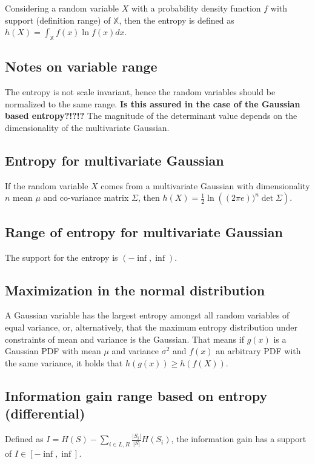 \documentclass[10pt,a4paper]{article}
\begin{document}
Considering a random variable $X$ with a probability density function $f$ with support (definition range) of $\mathbb{X}$, then the entropy is defined as $h(X) = \int_{\mathbb{X}}f(x)\ln f(x) dx$.

\subsection{Notes on variable range}
The entropy is not scale invariant, hence the random variables should be normalized to the same range.
\textbf{Is this assured in the case of the Gaussian based entropy?!?!?}
The magnitude of the determinant value depends on the dimensionality of the multivariate Gaussian.

\subsection{Entropy for multivariate Gaussian}
If the random variable $X$ comes from a multivariate Gaussian with dimensionality $n$ mean $\mu$ and co-variance matrix $\Sigma$, then $h(X) = \frac{1}{2} \ln\left((2\pi e))^n \det{\Sigma}\right)$.

\subsection{Range of entropy for multivariate Gaussian}
The support for the entropy is $(-\inf, \inf)$.

\subsection{Maximization in the normal distribution}
A Gaussian variable has the largest entropy amongst all random variables of equal variance, or, alternatively, that the maximum entropy distribution under constraints of mean and variance is the Gaussian.
That means if $g(x)$ is a Gaussian PDF with mean $\mu$ and variance $\sigma^2$ and $f(x)$ an arbitrary PDF with the same variance, it holds that $h(g(x)) \geq h(f(X))$.

\subsection{Information gain range based on entropy (differential)}
Defined as $I = H(S) - \sum_{i\in{L,R}}\frac{|S_i|}{|S|}H(S_i)$, the information gain has a support of $I \in [-\inf, \inf]$.
\end{document}
